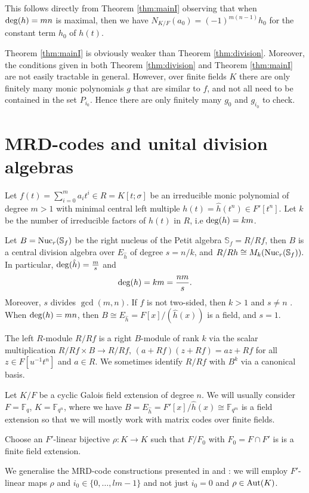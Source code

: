 \documentclass[12pt]{amsart}
\theoremstyle{plain}
\theoremstyle{definition}
\numberwithin{equation}{section}
\numberwithin{figure}{section}
\begin{document}
This follows directly from Theorem \ref{thm:mainI} observing that when ${\rm deg}(h)=mn$ is maximal, then we have $N_{K/F}(a_0)=(-1)^{m(n-1)}h_0$ for the constant term $h_0$ of $h(t)$.

 Theorem \ref{thm:mainI} is obviously weaker than Theorem \ref{thm:division}. Moreover, the conditions given in both Theorem \ref{thm:division} and  Theorem \ref{thm:mainI} are not easily tractable in general. However,  over finite fields $K$ there are only finitely many monic polynomials $g$ that are similar to $f$,  and not all need to be contained in the set $P_{i_0}$. Hence there are only finitely many $g_0$ and $g_{i_0}$ to check.


\section{MRD-codes and unital division algebras}


Let $f(t)=\sum_{i=0}^ma_it^i\in R=K[t;\sigma]$ be an irreducible monic polynomial of degree $m>1$  with minimal central left multiple $h(t)=\hat{h}(t^n)\in F'[t^n]$. Let $k$ be the number of irreducible factors of $h(t)$ in $R$, i.e  ${\rm deg}(h)=km$.

Let $B={\rm Nuc}_r(\mathbb{S}_f)$ be the right nucleus of the Petit algebra $\mathbb{S}_f=R/Rf$, then
$B$ is a central division algebra over $E_{\hat{h}}$ of degree $s=n/k$, and $ R/Rh \cong M_k({\rm Nuc}_r(\mathbb{S}_f)).$
 In particular,  ${\rm deg}(\hat{h})=\frac{m}{s}$ and
 $${\rm deg}(h)=km=\frac{n m}{s}.$$
 Moreover, $s$ divides $\gcd (m,n)$. If $f$ is not two-sided, then $k>1$ and $s\not=n$ \cite[Theorem 3]{PT2}.
When ${\rm deg }(h)=mn$, then $B\cong E_{\hat{h}}=F[x]/ (\hat{h}(x) )$ is a field, and $s=1$.

The left $R$-module $R/Rf$ is a right $B$-module of rank $k$ via the scalar multiplication $R/Rf\times B\longrightarrow R/Rf$, $(a+Rf)(z+Rf)=az+Rf$
for all $z\in F[u^{-1}t^n]$ and $a\in R$. We sometimes identify $R/Rf$ with $B^{k}$ via a canonical basis.

 Let $K/F$ be a cyclic Galois field extension of degree $n$.
 We will usually  consider $F=\mathbb{F}_{q}$, $K=\mathbb{F}_{q^n}$, where we have $B=E_{\hat{h}}=F'[x]/ \hat{h}(x)\cong \mathbb{F}_{q^m}$ is a field extension so that  we will mostly work with matrix codes over finite fields.

Choose an $F'$-linear bijective $\rho:K\to K$ such that $F/F_0$  with $F_0=F\cap F'$ is  is a finite field extension.

We generalise the MRD-code constructions presented in \cite{Sheekey} and \cite{NewS}: we will employ   $F'$-linear maps $\rho$ and $i_0\in\{0,\dots,lm-1\}$ and not just $i_0=0$ and
$\rho\in {\rm Aut}(K)$.
\end{document}
